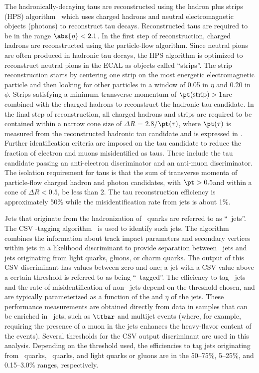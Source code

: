 \documentclass[12pt,twoside,a4paper,cmspaper,final,collab]{cms-tdr}
\begin{document}
The hadronically-decaying taus are reconstructed using the hadron plus strips (HPS) algorithm~\cite{Chatrchyan:2012zz} which
uses charged hadrons and neutral electromagnetic objects (photons) to
reconstruct tau decays. Reconstructed taus are required to be in the range $\abs{\eta} < 2.1$. In the first step of reconstruction, charged hadrons are reconstructed using the particle-flow algorithm.
Since neutral pions are often produced in hadronic tau decays, the HPS algorithm is optimized to reconstruct
neutral pions in the ECAL as objects called ``strips''. The strip reconstruction starts by centering one strip on the most
energetic electromagnetic particle and then looking for other particles in a window of 0.05 in $\eta$ and 0.20 in $\phi$.
Strips satisfying a minimum transverse momentum of $\pt(\text{strip})>1$\GeV are combined with the charged hadrons
to reconstruct the hadronic tau candidate.
In the final step of reconstruction, all charged hadrons and strips are required to be contained within a narrow cone size
of $\Delta R$ = 2.8/$\pt(\tau)$, where
$\pt(\tau)$ is measured from the reconstructed hadronic tau
candidate and is expressed in \GeVns.
Further identification criteria are imposed on the tau candidate to
reduce the fraction of electron and muons misidentified as taus.
These include the tau candidate passing an anti-electron
discriminator and an anti-muon discriminator. The isolation
requirement for taus is that the sum
of transverse momenta of particle-flow charged hadron and photon
candidates, with $\pt > 0.5$\GeV and within a cone of $\Delta R<0.5$, be less than 2\GeV. The tau reconstruction efficiency is approximately
50\% while the misidentification rate from jets is about 1\%.


Jets that originate from the hadronization of \cPqb\ quarks
are referred to as ``\cPqb\ jets''.  The CSV \cPqb-tagging
algorithm~\cite{Chatrchyan:2012jua} is used to identify such jets.
The algorithm combines
the information about track impact parameters and secondary
vertices within jets in a likelihood discriminant to provide separation
between \cPqb\ jets and jets originating from light quarks, gluons, or
charm quarks. The output of this CSV discriminant has values between zero
and one; a jet with a CSV value above a certain threshold is referred to
as being ``\cPqb\ tagged''. The efficiency to tag \cPqb\ jets and the rate of
misidentification of non-\cPqb\ jets depend on the
threshold chosen, and are typically parameterized as a function of the
\pt and $\eta$ of the jets.
These performance measurements are obtained directly from data in
samples that can be enriched in \cPqb\ jets, such as $\ttbar$ and multijet
events (where, for example, requiring the presence of a muon in the
jets enhances the heavy-flavor content of the events).
Several thresholds for the CSV output discriminant are used in this analysis.
Depending on the threshold used, the efficiencies to tag jets
originating from \cPqb\ quarks, \cPqc\ quarks, and light quarks or gluons are in
the 50--75\%, 5--25\%, and 0.15--3.0\% ranges, respectively.
\end{document}
